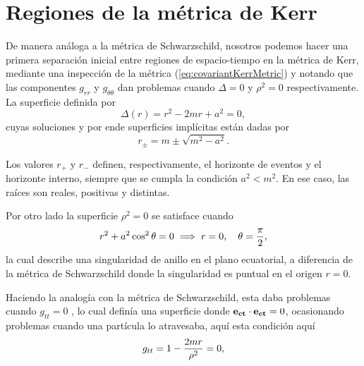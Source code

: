 \section{Regiones de la métrica de Kerr}
De manera análoga a la métrica de Schwarzschild, nosotros podemos hacer una primera separación inicial entre regiones de espacio-tiempo en la métrica de Kerr, mediante una inspección de la métrica (\ref{eq:covariantKerrMetric}) y notando que las componentes $g_{rr}$ y $g_{\theta \theta}$ dan problemas cuando $\Delta=0$ y $\rho^2=0$ respectivamente.
La superficie definida por
\begin{equation}
    \Delta(r)=r^2-2mr+a^2=0 ,
\end{equation}
cuyas soluciones y por ende superficies implícitas están dadas por
\begin{equation}
    r_{\pm}=m \pm \sqrt{m^2-a^2}.
\end{equation}

Los valores $r_{+}$ y $r_{-}$ definen, respectivamente, el horizonte de eventos y el horizonte interno, siempre que se cumpla la condición $a^2<m^2$. En ese caso, las raíces son reales, positivas y distintas.

Por otro lado la superficie $\rho^2=0$ se satisface cuando
\begin{equation}
    r^2+a^2 \cos ^2 \theta=0 \implies r=0 , \quad \theta=\frac{\pi}{2},
\end{equation}
la cual describe una singularidad de anillo en el plano ecuatorial, a diferencia de la métrica de Schwarzschild donde la singularidad es puntual en el origen $r=0$.

Haciendo la analogía con la métrica de Schwarzschild, esta daba problemas cuando $g_{tt}=0$ , lo cual definía una superficie donde $\mathbf{e_{ct}}\cdot \mathbf{e_{ct}} = 0$, ocasionando problemas cuando una partícula lo atravesaba, aquí  esta condición aquí
\begin{equation}
    g_{tt}=1-\frac{2mr}{\rho^2}=0,
\end{equation}

